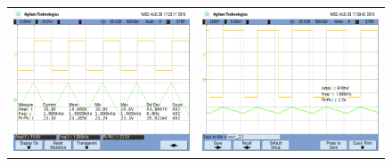 \begin{figure}[H]
	\centering
	\begin{tabular}{c c}
		\includegraphics[scale=0.2]{../EJ4/Integrador/Mediciones/Osciloscopio/PCB_Compensado/osc_15.png} &
		\includegraphics[scale=0.2]{../EJ4/Integrador/Mediciones/Osciloscopio/PCB_Compensado/osc_16.png} \\

\end{tabular}
\end{figure}
